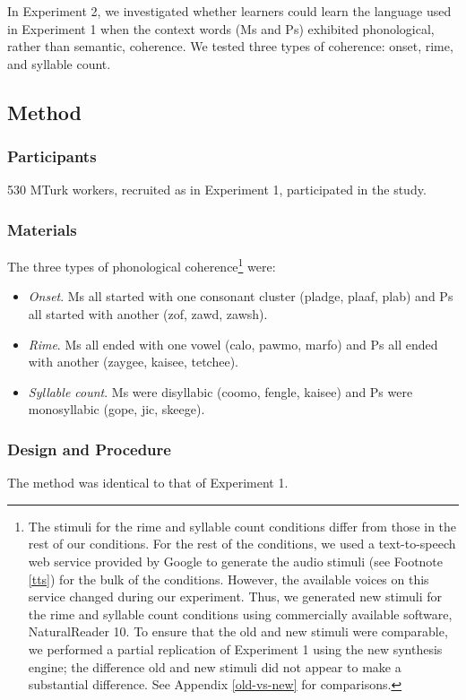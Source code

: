 \documentclass[man,floatsintext]{apa6}
\begin{document}
In Experiment 2, we investigated whether learners could learn the language used in  Experiment 1 when the context words (Ms and Ps) exhibited phonological, rather than semantic, coherence. We tested three types of coherence: onset, rime, and syllable count.

\subsection{Method}
\subsubsection{Participants} 
530 MTurk workers, recruited as in Experiment 1, participated in the study.

\subsubsection{Materials}
The three types of phonological coherence\footnote{\label{change-of-stimuli} The stimuli for the rime and syllable count conditions differ from those in the rest of our conditions. For the rest of the conditions, we used a text-to-speech web service provided by Google to generate the audio stimuli (see Footnote \ref{tts}) for the bulk of the conditions. However, the available voices on this service changed during our experiment. Thus, we generated new stimuli for the rime and syllable count conditions using commercially available software, NaturalReader 10. To ensure that the old and new stimuli were comparable, we performed a partial replication of Experiment 1 using the new synthesis engine; the difference old and new stimuli did not appear to make a substantial difference. See Appendix \ref{old-vs-new} for comparisons.} were:

\begin{itemize}
\item \emph{Onset}. Ms all started with one consonant cluster (pladge, plaaf, plab) and Ps all started with another (zof, zawd, zawsh).
\item \emph{Rime}. Ms all ended with one vowel (calo, pawmo, marfo) and Ps all ended with another (zaygee, kaisee, tetchee).
\item \emph{Syllable count}. Ms were disyllabic (coomo, fengle, kaisee) and Ps were monosyllabic (gope, jic, skeege).
\end{itemize}

\subsubsection{Design and Procedure}
The method was identical to that of Experiment 1.
\end{document}
